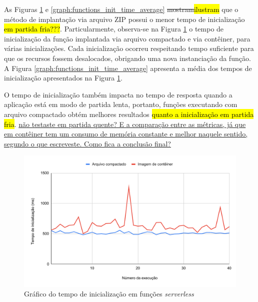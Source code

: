 \documentclass[10pt,conference]{IEEEtran}
\begin{document}
As Figuras \ref{graph:functions_init_time} e \ref{graph:functions_init_time_average} \st{mostram}\hl{ilustram} que o método de implantação via arquivo ZIP possui o menor tempo de inicialização \hl{em partida fria???}. Particularmente, observa-se na Figura \ref{graph:functions_init_time} o tempo de inicialização da função implantada via arquivo compactado e via contêiner, para várias inicializações. Cada inicialização ocorreu respeitando tempo suficiente para que os recursos fossem desalocados, obrigando uma nova instanciação da função. A Figura \ref{graph:functions_init_time_average} apresenta a média dos tempos de inicialização apresentados na Figura \ref{graph:functions_init_time}.

O tempo de inicialização também impacta no tempo de resposta quando a aplicação está em modo de partida lenta, portanto, funções executando com arquivo compactado obtém melhores resultados \hl{quanto a inicialização em partida fria}. \ul{não testaste em partida quente? E a comparação entre as métricas, já que em contêiner tem um consumo de memória constante e melhor naquele sentido, segundo o que escreveste. Como fica a conclusão final?}

\begin{figure}[htbp]
    \centering 
    \includegraphics [width=\linewidth]{images/init-time-PT.pdf}
    \par
    \caption{Gráfico do tempo de inicialização em funções \textit{serverless}}
    \label{graph:functions_init_time}
\end{figure}
\end{document}
